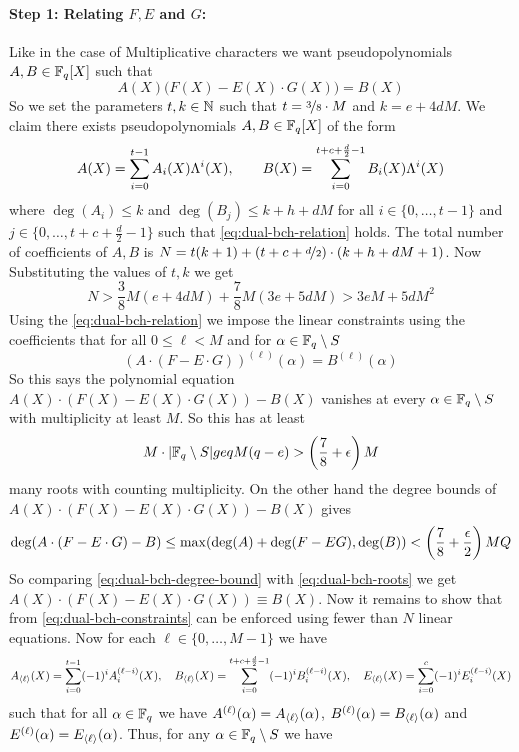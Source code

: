\paragraph*{Step 1: Relating $F,E$ and $G$:} Like in the case of Multiplicative characters we want pseudopolynomials $A,B\in\mathbb{F}_q[X]$ such that 
\begin{equation}\label{eq:dual-bch-relation}
  A(X)\big(F(X)-E(X)\cdot G(X)\big)=B(X)
\end{equation}
So we set the parameters $t,k\in\mathbb{N}$ such that $t=\nicefrac38\cdot M$ and $k=e+4dM$. We claim there exists pseudopolynomials $A,B\in\mathbb{F}_q[X]$ of the form $$A(X)=\sum_{i=0}^{t-1}A_i(X)\Lambda^i(X),\qquad B(X)=\sum_{i=0}^{t+c+\frac{d}2-1}B_i(X)\Lambda^i(X)$$ where $\deg(A_i)\leq k$ and $\deg(B_j)\leq k+h+dM$ for all $i\in \{0,\dots, t-1\}$ and $j\in\{0,\dots, t+c+\frac{d}2-1\}$ such that \eqref{eq:dual-bch-relation} holds. The total number of coefficients of $A,B$ is $N=t(k+1)+(t+c+\nicefrac{d}2)\cdot (k+h+dM+1)$. Now Substituting the values of $t,k$ we get \begin{equation}\label{eq:dual-bch-num-coeff}
  N>\frac38M(e+4dM)+\frac78M(3e+5dM)>3eM+5dM^2
\end{equation}Using the \eqref{eq:dual-bch-relation} we impose the linear constraints using the coefficients that for all $0\leq \ell<M$ and for $\alpha\in\mathbb{F}_q\setminus S$\begin{equation}\label{eq:dual-bch-constraints}
  (A\cdot (F-E\cdot G))^{(\ell)}(\alpha)=B^{(\ell)}(\alpha)
\end{equation} 
So this says the polynomial equation $A(X)\cdot (F(X)-E(X)\cdot G(X))-B(X)$ vanishes at every $\alpha\in\mathbb{F}_q\setminus S$ with multiplicity at least $M$. So this has at least \begin{equation}\label{eq:dual-bch-roots}
  M\cdot |\mathbb{F}_q\setminus S|geq M(q-e)>\left(\frac78+\epsilon\right)M
\end{equation}
many roots with counting multiplicity. On the other hand the degree bounds of $A(X)\cdot (F(X)-E(X)\cdot G(X))-B(X)$ gives 
\begin{equation}\label{eq:dual-bch-degree-bound}
  \deg(A\cdot (F-E\cdot G)-B)\leq \max (\deg(A)+\deg(F-EG),\deg(B))<\left(\frac78+\frac{\epsilon}2\right)MQ
\end{equation}
So comparing \eqref{eq:dual-bch-degree-bound} with \eqref{eq:dual-bch-roots} we get $A(X)\cdot (F(X)-E(X)\cdot G(X))\equiv B(X)$. Now it remains to show that from \eqref{eq:dual-bch-constraints} can be enforced using fewer than $N$ linear equations. Now for each $\ell\in\{0,\dots, M-1\}$ we have $$A_{\langle\ell\rangle}(X)=\sum_{i=0}^{t-1}(-1)^iA_i^{(\ell-i)}(X),\quad B_{\langle\ell\rangle}(X)=\sum_{i=0}^{t+c+\frac{d}2-1}(-1)^iB_i^{(\ell-i)}(X),\quad E_{\langle\ell\rangle}(X)=\sum_{i=0}^c(-1)^iE_i^{(\ell-i)}(X)$$such that for all $\alpha\in\mathbb{F}_q$ we have $A^{(\ell)}(\alpha)=A_{\langle\ell\rangle}(\alpha)$, $B^{(\ell)}(\alpha)=B_{\langle\ell\rangle}(\alpha)$ and $E^{(\ell)}(\alpha)=E_{\langle\ell\rangle}(\alpha)$. Thus, for any $\alpha\in\mathbb{F}_q\setminus S$ we have 

